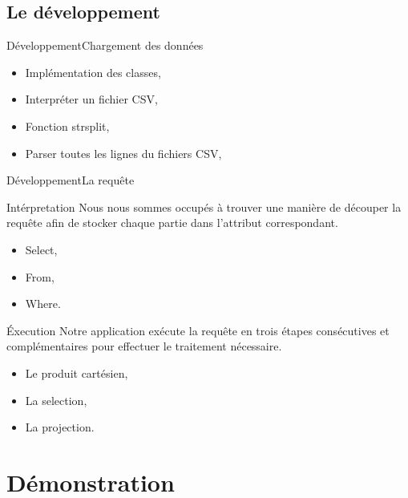 \documentclass[10pt,handout]{beamer}
\begin{document}
\subsection{Le développement}

\begin{frame}{Développement}{Chargement des données}
  \begin{itemize}
    \item Implémentation des classes,
    \item Interpréter un fichier CSV,
    \item Fonction strsplit,
    \item Parser toutes les lignes du fichiers CSV,
  \end{itemize}
\end{frame}

\begin{frame}{Développement}{La requête}
  \begin{block}{Intérpretation}
    Nous nous sommes occupés à trouver une manière de découper la requête afin de stocker chaque partie dans l’attribut correspondant.
    \begin{itemize}
      \item Select,
      \item From,
      \item Where.
    \end{itemize}
  \end{block}

  \begin{block}{Éxecution}
    Notre application exécute la requête en trois étapes consécutives et complémentaires pour effectuer le traitement nécessaire.
    \begin{itemize}
      \item Le produit cartésien,
      \item La selection,
      \item La projection.
    \end{itemize}
  \end{block}
\end{frame}


\section{Démonstration}

\end{document}
